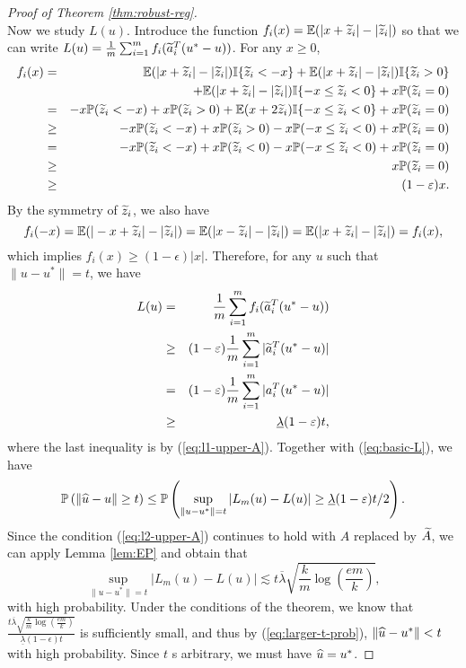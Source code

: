 \begin{proof}[Proof of Theorem \ref{thm:robust-reg}]
\begin{equation}
\end{equation}
Now we study $L(u)$. Introduce the function $f_i(x)=\mathbb{E}(|x+\widetilde{z}_i|-|\widetilde{z}_i|)$ so that we can write $L(u)=\frac{1}{m}\sum_{i=1}^mf_i(\widetilde{a}_i^T(u^*-u))$. For any $x\geq 0$,
\begin{eqnarray*}
f_i(x) &=& \mathbb{E}(|x+\wt{z}_i|-|\wt{z}_i|)\mathbb{I}\{\wt{z}_i<-x\} + \mathbb{E}(|x+\wt{z}_i|-|\wt{z}_i|)\mathbb{I}\{\wt{z}_i> 0\} \\
&& + \mathbb{E}(|x+\wt{z}_i|-|\wt{z}_i|)\mathbb{I}\{-x\leq \wt{z}_i< 0\} + x\mathbb{P}(\wt{z}_i=0) \\
&=& -x\mathbb{P}(\wt{z}_i<-x) + x\mathbb{P}(\wt{z}_i> 0) + \mathbb{E}(x+2\wt{z}_i)\mathbb{I}\{-x\leq \wt{z}_i<0\}   + x\mathbb{P}(\wt{z}_i=0) \\
&\geq& -x\mathbb{P}(\wt{z}_i<-x) + x\mathbb{P}(\wt{z}_i> 0) - x\mathbb{P}(-x\leq \wt{z}_i< 0)   + x\mathbb{P}(\wt{z}_i=0) \\
&=& -x\mathbb{P}(\wt{z}_i<-x) + x\mathbb{P}(\wt{z}_i< 0) - x\mathbb{P}(-x\leq \wt{z}_i< 0)  + x\mathbb{P}(\wt{z}_i=0) \\
&\geq& x\mathbb{P}(\wt{z}_i=0) \\
&\geq& (1-\epsilon)x.
\end{eqnarray*}
By the symmetry of $\widetilde{z}_i$, we also have
$$f_i(-x)=\mathbb{E}(|-x+\widetilde{z}_i|-|\widetilde{z}_i|)=\mathbb{E}(|x-\widetilde{z}_i|-|\widetilde{z}_i|)=\mathbb{E}(|x+\widetilde{z}_i|-|\widetilde{z}_i|)=f_i(x),$$
which implies $f_i(x)\geq (1-\epsilon)|x|$. Therefore, for any $u$ such that $\|u-u^*\|=t$, we have
\begin{eqnarray*}
L(u) &=& \frac{1}{m}\sum_{i=1}^mf_i(\wt{a}_i^T(u^*-u)) \\
&\geq& (1-\epsilon)\frac{1}{m}\sum_{i=1}^m|\wt{a}_i^T(u^*-u)| \\
&=& (1-\epsilon)\frac{1}{m}\sum_{i=1}^m|a_i^T(u^*-u)| \\
&\geq& \underline{\lambda}(1-\epsilon)t,
\end{eqnarray*}
where the last inequality is by (\ref{eq:l1-upper-A}). Together with (\ref{eq:basic-L}), we have
\begin{equation}
\mathbb{P}\left(\|\wh{u}-u\|\geq t\right) \leq \mathbb{P}\left(\sup_{\|u-u^*\|= t}|L_m(u)-L(u)| \geq \underline{\lambda}(1-\epsilon)t/2\right). \label{eq:larger-t-prob}
\end{equation}
Since the condition (\ref{eq:l2-upper-A}) continues to hold with $A$ replaced by $\widetilde{A}$, we can apply Lemma \ref{lem:EP} and obtain that
$$\sup_{\|u-u^*\|= t}|L_m(u)-L(u)| \lesssim t\overline{\lambda}\sqrt{\frac{k}{m}\log\left(\frac{em}{k}\right)},$$
with high probability. Under the conditions of the theorem, we know that $\frac{t\overline{\lambda}\sqrt{\frac{k}{m}\log\left(\frac{em}{k}\right)}}{\underline{\lambda}(1-\epsilon)t}$ is sufficiently small, and thus by (\ref{eq:larger-t-prob}), $\|\widehat{u}-u^*\|<t$ with high probability. Since $t$ s arbitrary, we must have $\widehat{u}=u^*$.
\end{proof}


